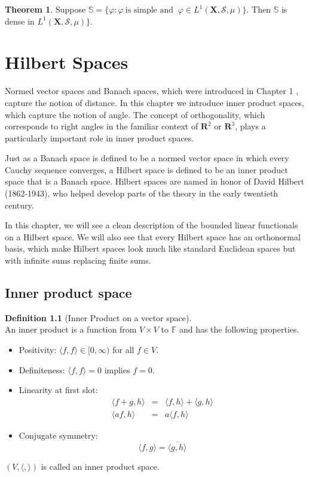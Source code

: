 \documentclass[12pt]{book}
\theoremstyle{definition}
\newtheorem{definition}{Definition}[chapter]
\newtheorem{theorem}{Theorem}[chapter]
\newcommand{\inner}[2]{{\langle #1,#2\rangle}}
\newcommand{\F}{\mathbb{F}}
\newcommand{\X}{\mathbf{X}}
\begin{document}
\begin{theorem}
Suppose $\mathbb{S}=\{\varphi: \varphi \ \text{is simple and } \ \varphi \in L^1(\X,\mathcal S,\mu) \}$. Then $\mathbb{S}$ is dense in $L^1(\X,\mathcal S,\mu)\}$.
\end{theorem}


\chapter{Hilbert Spaces}

Normed vector spaces and Banach spaces, which were introduced in Chapter 1 , capture the notion of distance. In this chapter we introduce inner product spaces, which capture the notion of angle. The concept of orthogonality, which corresponds to right angles in the familiar context of $\mathbf{R}^2$ or $\mathbf{R}^3$, plays a particularly important role in inner product spaces.

Just as a Banach space is defined to be a normed vector space in which every Cauchy sequence converges, a Hilbert space is defined to be an inner product space that is a Banach space. Hilbert spaces are named in honor of David Hilbert (1862-1943), who helped develop parts of the theory in the early twentieth century.

In this chapter, we will see a clean description of the bounded linear functionals on a Hilbert space. We will also see that every Hilbert space has an orthonormal basis, which make Hilbert spaces look much like standard Euclidean spaces but with infinite sums replacing finite sums.

\newpage
\section{Inner product space}
\begin{definition}[Inner Product on a vector space] \ \\
An inner product is a function from $V \times V$ to $\F$ and has the following properties.
\begin{itemize}
	\item Positivity: $\inner{f}{f}\in[0,\infty)$ for all $f\in V$.
	\item Definiteness: $\inner{f}{f}=0$ implies $f=0$.
	\item Linearity at first slot:
	\begin{eqnarray*}
		\inner{f+g}{h}&=&\inner{f}{h}+\inner{g}{h} \\
		\inner{af}{h} &=& a\inner{f}{h}
	\end{eqnarray*}
	\item Conjugate symmetry:
	$$
	\inner{f}{g} = \overline{\inner{g}{h}}
	$$
\end{itemize}
$(V,\inner{}{})$ is called an inner product space.
\end{definition}
\end{document}
